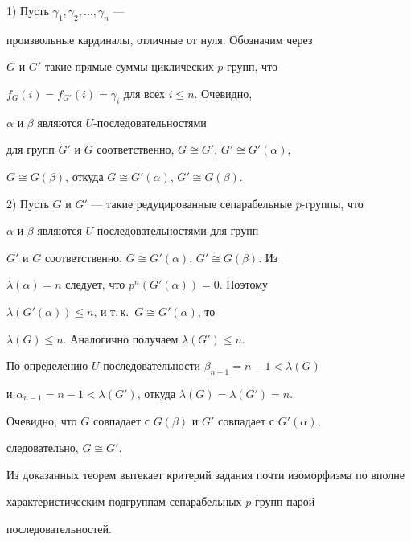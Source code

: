 \begin{pf}


1) Пусть $\gamma_1,\gamma_2,\dotsc,\gamma_n$ ---


произвольные кардиналы, отличные от нуля. Обозначим через


$G$ и $G'$ такие прямые суммы циклических $p$-групп, что


$f_G(i)=f_{G'}(i)=\gamma_i$ для всех $i\leq n$. Очевидно,


$\alpha$ и $\beta$ являются $U$-последовательностями


для групп $G'$ и $G$ соответственно, $G\cong G'$, $G'\cong G'(\alpha)$,


$G\cong G(\beta)$, откуда $G\cong G'(\alpha)$, $G'\cong G(\beta)$.





2) Пусть $G$ и $G'$ --- такие редуцированные сепарабельные $p$-группы, что


$\alpha$ и $\beta$ являются $U$-последовательностями для групп


$G'$ и $G$ соответственно, $G\cong G'(\alpha)$, $G'\cong G(\beta)$. Из


$\lambda(\alpha)=n$ следует, что $p^n(G'(\alpha))=0$. Поэтому


$\lambda(G'(\alpha))\leq n$, и т.\,к.\ $G\cong G'(\alpha)$, то


$\lambda(G)\leq n$. Аналогично получаем $\lambda(G')\leq n$.


По определению $U$-последовательности $\beta_{n-1}=n-1<\lambda(G)$


и $\alpha_{n-1}=n-1<\lambda(G')$, откуда $\lambda(G)=\lambda(G')=n$.


Очевидно, что $G$ совпадает с $G(\beta)$ и $G'$ совпадает с $G'(\alpha)$,


следовательно, $G\cong G'$.


\end{pf}





Из доказанных теорем вытекает критерий задания почти изоморфизма по вполне


характеристическим подгруппам сепарабельных $p$-групп парой


последовательностей.





